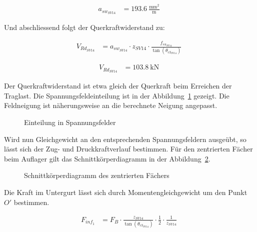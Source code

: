 \documentclass[
  11pt,
  letterpaper,
]{scrreprt}
\begin{document}
$$
\begin{aligned}
a_{sw_{SV14}} &= 193.6\ \frac{\mathrm{mm}^{2}}{\mathrm{m}} \;
\end{aligned}
$$

Und abschliessend folgt der Querkraftwiderstand zu:

$$
\begin{aligned}
V_{Rd_{SV14}} &= a_{sw_{SV14}} \cdot z_{SV14} \cdot \frac{ f_{su_{SV14}} }{ \tan \left( \theta_{c3_{SV14}} \right) } \; 
\end{aligned}
$$

$$
\begin{aligned}
V_{Rd_{SV14}} &= 103.8\ \mathrm{kN} \;
\end{aligned}
$$

Der Querkraftwiderstand ist etwa gleich der Querkraft beim Erreichen der
Traglast. Die Spannungsfeldeinteilung ist in der
Abbildung~\ref{fig-spannungsfelder_sv14} gezeigt. Die Feldneigung ist
näherungsweise an die berechnete Neigung angepasst.

\begin{figure}[H]


\caption{\label{fig-spannungsfelder_sv14}Einteilung in Spannungsfelder}

\end{figure}%

Wird nun Gleichgewicht an den entsprechenden Spannungsfeldern ausgeübt,
so lässt sich der Zug- und Druckkraftverlauf bestimmen. Für den
zentrierten Fächer beim Auflager gilt das Schnittkörperdiagramm in der
Abbildung~\ref{fig-skd_1_spannungsfelder_sv14}.

\begin{figure}[H]


\caption{\label{fig-skd_1_spannungsfelder_sv14}Schnittkörperdiagramm des
zentrierten Fächers}

\end{figure}%

Die Kraft im Untergurt lässt sich durch Momentengleichgewicht um den
Punkt \(O'\) bestimmen.

$$
\begin{aligned}
F_{inf_{1}} &= F_{B} \cdot \frac{ z_{SV14} }{ \tan \left( \theta_{c3_{SV14}} \right) } \cdot \frac{1} { 2 } \cdot \frac{1} { z_{SV14} } \; 
\end{aligned}
$$
\end{document}
